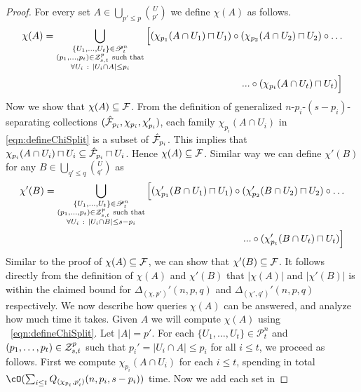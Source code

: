 \begin{proof}
For every set $A \in \bigcup_{p'\leq p}{U \choose p'}$ we define $\chi(A)$ as follows.
\begin{align}\label{eqn:defineChiSplit} 
\chi(A) = \bigcup_{\substack{\{U_1,\ldots,U_{t}\} \in \mathscr{P}_{t}^n\\(p_1,\ldots,p_t) \in {\cal Z}_{s,t}^{p}~\mbox{\scriptsize such that}\\ \forall U_i~:~|U_i \cap A| \leq p_i}} 
\Big[({\chi}_{p_1}(A \cap U_1) \sqcap U_1) \circ ({\chi}_{p_2}(A \cap U_2) \sqcap U_2) \circ \ldots \\
\nonumber ... \circ ({\chi}_{p_t}(A \cap U_t) \sqcap U_t)\Big] 
\end{align}
Now we show that $\chi(A)\subseteq {\cal F}$. From the definition of generalized $n$-${p_i}$-$(s-{p_i})$-separating 
collections $(\hat{\cal F}_{{p_i}},\chi_{{p_i}},\chi'_{{p_i}})$, each family $\chi_{p_i}(A\cap U_i)$ in~
\eqref{eqn:defineChiSplit} is a subset of $\hat{\cal F}_{p_i}$. This implies that 
$\chi_{p_i}(A\cap U_i)\sqcap U_i\subseteq \hat{\cal F}_{p_i} \sqcap U_i$. Hence $\chi(A)\subseteq {\cal F}$.   
Similar way we can define $\chi'(B)$ for any $B\in\bigcup_{q'\leq q}{U\choose q'}$ as
\begin{align}\label{eqn:defineChiprimeSplit} 
\chi'(B) = \bigcup_{\substack{\{U_1,\ldots,U_{t}\} \in \mathscr{P}_{t}^n\\(p_1,\ldots,p_t) \in {\cal Z}_{s,t}^{p}~\mbox{\scriptsize such that} \\ \forall U_i~:~|U_i \cap B| \leq s-p_i }} 
\Big[({\chi}'_{p_1}(B \cap U_1) \sqcap U_1) \circ ({\chi}'_{p_2}(B \cap U_2) \sqcap U_2) \circ \ldots \\
\nonumber ... \circ ({\chi}'_{p_t}(B \cap U_t) \sqcap U_t)\Big] 
\end{align}
Similar to the proof of $\chi(A)\subseteq {\cal F}$, we can show that $\chi'(B)\subseteq {\cal F}$. 
It follows directly from the definition of  $\chi(A)$ and $\chi'(B)$ that $|\chi(A)|$ and $|\chi'(B)|$ is within the 
claimed bound for $\Delta_{(\chi,p')}'(n,p,q)$ and $\Delta_{(\chi',q')}'(n,p,q)$ respectively. We now describe how 
queries $\chi(A)$ can be answered, and analyze how much time it takes. Given $A$ we will compute $\chi(A)$ using  ~\eqref{eqn:defineChiSplit}. Let $|A|=p'$. 
For each $\{U_1,\ldots,U_{t}\} \in \mathscr{P}_{t}^n$ and $(p_1,\ldots,p_t) \in {\cal Z}_{s,t}^{p}$ such that $p_i' = |U_i \cap A| \leq p_i$ for all $i \leq t$, 
we proceed as follows. First we compute ${\chi}_{p_i}(A \cap U_i)$ for each $i \leq t$, spending in total 
$\cO(\sum_{i \leq t} Q_{(\chi_{p_i},p_i')}(n,p_i,s-p_i))$ time. Now we add each set in 

\end{proof}
